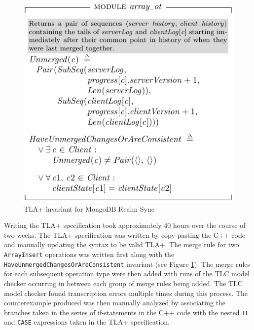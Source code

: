 \documentclass{vldb}
\begin{document}

\begin{figure}
\includegraphics{array_ot_invariant.pdf}
\caption{TLA+ invariant for MongoDB Realm Sync}
\label{fig:tlaplus_realm_sync_invariant}
\end{figure}

Writing the TLA+ specification took approximately 40 hours over the course of two weeks. The TLA+ specification was written by copy-pasting the C++ code and manually updating the syntax to be valid TLA+. The merge rule for two \texttt{ArrayInsert} operations was written first along with the \texttt{HaveUnmergedChangesOrAreConsistent} invariant (see Figure \ref{fig:tlaplus_realm_sync_invariant}).
The merge rules for each subsequent operation type were then added with runs of the TLC model checker occurring in between each group of merge rules being added.
The TLC model checker found transcription errors multiple times during this process. The counterexample produced was then manually analyzed by associating the branches taken in the series of if-statements in the C++ code with the nested \texttt{IF} and \texttt{CASE} expressions taken in the TLA+ specification.
\end{document}
